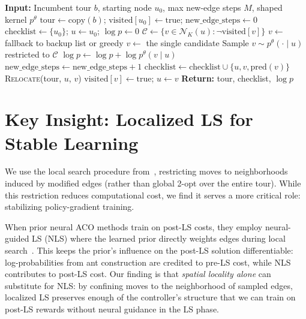 \documentclass[sigconf,anonymous,review]{acmart}
\theoremstyle{definition}
\theoremstyle{plain}
\begin{document}
\begin{algorithm}[t]
\caption{Perturbation-Based Ant Construction}
\label{alg:perturbation}
\begin{algorithmic}[1]
\STATE \textbf{Input:} Incumbent tour $b$, starting node $u_0$, max new-edge steps $M$, shaped kernel $p^\theta$
\STATE $\text{tour} \leftarrow \text{copy}(b)$; $\text{visited}[u_0] \leftarrow \text{true}$; $\text{new\_edge\_steps} \leftarrow 0$
\STATE $\text{checklist} \leftarrow \{u_0\}$; $u \leftarrow u_0$; $\log p \leftarrow 0$
    \STATE $\mathcal{C} \leftarrow \{v \in \mathcal{N}_K(u) : \neg\text{visited}[v]\}$ 
        \STATE $v \leftarrow$ fallback to backup list or greedy
        \STATE $v \leftarrow$ the single candidate 
    \ELSE
        \STATE Sample $v \sim p^\theta(\cdot \mid u)$ restricted to $\mathcal{C}$
        \STATE $\log p \leftarrow \log p + \log p^\theta(v \mid u)$
    \ENDIF
     
        \STATE $\text{new\_edge\_steps} \leftarrow \text{new\_edge\_steps} + 1$
        \STATE $\text{checklist} \leftarrow \text{checklist} \cup \{u, v, \text{pred}(v)\}$
    \ENDIF
    \STATE \textsc{Relocate}(tour, $u$, $v$) 
    \STATE $\text{visited}[v] \leftarrow \text{true}$; $u \leftarrow v$
\ENDWHILE
\STATE \textbf{Return:} tour, checklist, $\log p$
\end{algorithmic}
\end{algorithm}

\section{Key Insight: Localized LS for Stable Learning}
\label{sec:perturbative}

We use the local search procedure from~\cite{faco}, restricting moves to neighborhoods induced by modified edges (rather than global 2-opt over the entire tour).
While this restriction reduces computational cost, we find it serves a more critical role: stabilizing policy-gradient training.

When prior neural ACO methods train on post-LS costs, they employ neural-guided LS (NLS) where the learned prior directly weights edges during local search~\cite{deepaco,gfacs}.
This keeps the prior's influence on the post-LS solution differentiable: log-probabilities from ant construction are credited to pre-LS cost, while NLS contributes to post-LS cost.
Our finding is that \emph{spatial locality alone} can substitute for NLS: by confining moves to the neighborhood of sampled edges, localized LS preserves enough of the controller's structure that we can train on post-LS rewards without neural guidance in the LS phase.
\end{document}
